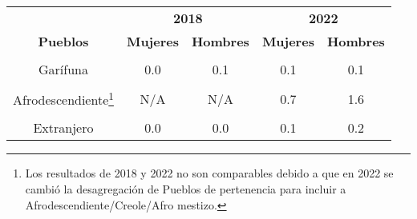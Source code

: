 \begin{tabular}[t]{ccccc}
\toprule
\multicolumn{1}{c}{\textbf{ }} & \multicolumn{2}{c}{\textbf{2018}} & \multicolumn{2}{c}{\textbf{2022}} \\
\cmidrule(l{3pt}r{3pt}){2-3} \cmidrule(l{3pt}r{3pt}){4-5}
\textbf{Pueblos} & \textbf{Mujeres} & \textbf{Hombres} & \textbf{Mujeres} & \textbf{Hombres}\\
\midrule
\cellcolor[HTML]{B6B3FF}{Maya} & \cellcolor[HTML]{B6B3FF}{10.7} & \cellcolor[HTML]{B6B3FF}{23.5} & \cellcolor[HTML]{B6B3FF}{11.6} & \cellcolor[HTML]{B6B3FF}{22.5}\\
Garífuna & 0.0 & 0.1 & 0.1 & 0.1\\
\cellcolor[HTML]{B6B3FF}{Xinka} & \cellcolor[HTML]{B6B3FF}{0.4} & \cellcolor[HTML]{B6B3FF}{1.4} & \cellcolor[HTML]{B6B3FF}{0.4} & \cellcolor[HTML]{B6B3FF}{0.8}\\
Afrodescendiente\footnote{Los resultados de 2018 y 2022 no son comparables debido a que en 2022 se cambió la desagregación de Pueblos de pertenencia para incluir a Afrodescendiente/Creole/Afro mestizo.} & N/A & N/A & 0.7 & 1.6\\
\cellcolor[HTML]{B6B3FF}{Ladino} & \cellcolor[HTML]{B6B3FF}{22.8} & \cellcolor[HTML]{B6B3FF}{41.1} & \cellcolor[HTML]{B6B3FF}{24.8} & \cellcolor[HTML]{B6B3FF}{37.2}\\
Extranjero & 0.0 & 0.0 & 0.1 & 0.2\\
\bottomrule
\end{tabular}
